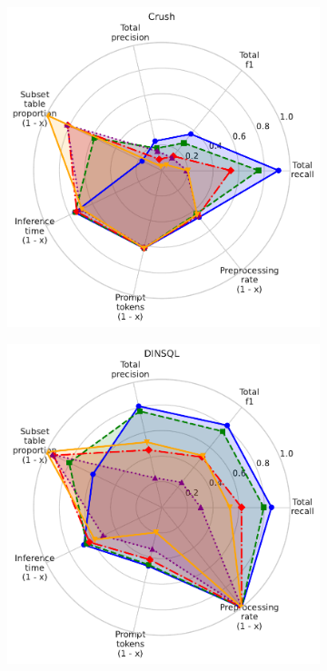 \begin{figure}
\begin{subfigure}{0.235\linewidth}
  \end{subfigure}
  \begin{subfigure}{0.235\linewidth}
    \centering
    \includegraphics[width=\linewidth]{figures/method_radar_charts/crush4sql_radar.pdf}
  \end{subfigure}
  \begin{subfigure}{0.235\linewidth}
    \centering
    \includegraphics[width=\linewidth]{figures/method_radar_charts/DINSQL_radar.pdf}

\end{subfigure}
\end{figure}
